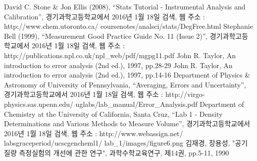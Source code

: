 \documentclass{GSHS-chemexp}
\begin{document}
	\begin{thebibliography}{00}
		 David C. Stone \& Jon Ellis (2008),
		``Stats Tutorial - Instrumental Analysis and Calibration'',
		경기과학고등학교에서 2016년 1월 18일 검색,
		웹 주소 :
		http://www.chem.utoronto.ca/\allowbreak
		coursenotes/analsci/stats/DegFree.html
		 Stephanie Bell (1999),
		``Measurement Good Practice Guide No. 11 (Issue 2)'',
		경기과학고등학교에서 2016년 1월 18일 검색,
		웹 주소 : http://publications.npl.co.uk/npl\_web/pdf/mgpg11.pdf
		 John R. Taylor,
		An introduction to error analysis (2nd ed.), 1997, pp.28-29
		 John R. Taylor,
		An introduction to error analysis (2nd ed.), 1997, pp.14-16
		 Department of Physics \& Astronomy of
		University of Pennsylvania, ``Averaging, Errors and
		Uncertainty'', 경기과학고등학교에서 2016년 1월 18일 검색,
		웹 주소 : http://\allowbreak virgo-physics.sas.upenn.edu/\allowbreak
		uglabs/\allowbreak lab\_manual/\allowbreak Error\_Analysis.pdf
		 Department of Chemistry at the University 
		of California, Santa Cruz, ``Lab 1 - Density Determinations and 
		Various Methods to Measure Volume'', 경기과학고등학교에서 
		2016년 1월 18일 검색, 웹 주소 :
		http://\allowbreak www.webassign.net/\allowbreak
		labsgraceperiod/\allowbreak ucscgencheml1/\allowbreak
		lab\_1/\allowbreak images/\allowbreak figure6.png
		 김재경, 장용성,
		"공기질량 측정실험의 개선에 관한 연구",
		과학수학교육연구, 제14권, pp.5-11, 1990
	\end{thebibliography}
			
\end{document}
